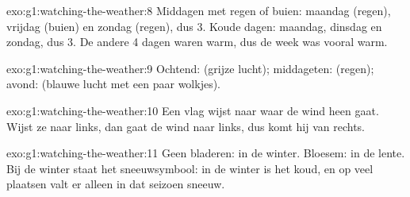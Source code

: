\begin{solution}{exo:g1:watching-the-weather:8}
Middagen met regen of buien: maandag (regen), vrijdag (buien) en zondag
(regen), dus 3. Koude dagen: maandag, dinsdag en zondag, dus 3. De andere
4 dagen waren warm, dus de week was vooral warm.
\end{solution}

\begin{solution}{exo:g1:watching-the-weather:9}
Ochtend:  (grijze lucht); middageten:  (regen);
avond:  (blauwe lucht met een paar wolkjes).
\end{solution}

\begin{solution}{exo:g1:watching-the-weather:10}
Een vlag wijst naar waar de wind heen gaat. Wijst ze naar links, dan gaat
de wind naar links, dus komt hij van rechts.
\end{solution}

\begin{solution}{exo:g1:watching-the-weather:11}
Geen bladeren: in de winter. Bloesem: in de lente. Bij de winter staat het
sneeuwsymbool: in de winter is het koud, en op veel plaatsen valt er alleen
in dat seizoen sneeuw.
\end{solution}
